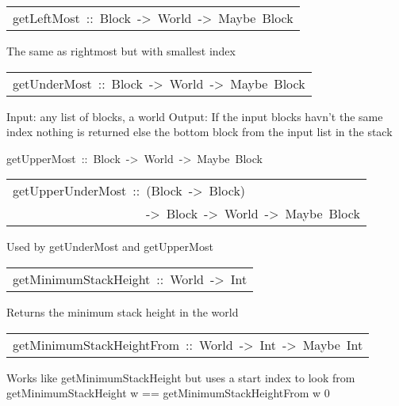 \begin{haddockdesc}
\item[\begin{tabular}{@{}l}
getLeftMost\ ::\ {\char 91}Block{\char 93}\ ->\ World\ ->\ Maybe\ Block
\end{tabular}]\haddockbegindoc
The same as rightmost but with smallest index
\par

\end{haddockdesc}
\begin{haddockdesc}
\item[\begin{tabular}{@{}l}
getUnderMost\ ::\ {\char 91}Block{\char 93}\ ->\ World\ ->\ Maybe\ Block
\end{tabular}]\haddockbegindoc
Input: any list of blocks, a world
  Output: If the input blocks havn't the same index nothing is returned else the bottom block from the 
        input list in the stack  
\par

\end{haddockdesc}
\begin{haddockdesc}
\item[
getUpperMost\ ::\ {\char 91}Block{\char 93}\ ->\ World\ ->\ Maybe\ Block
]
\end{haddockdesc}
\begin{haddockdesc}
\item[\begin{tabular}{@{}l}
getUpperUnderMost\ ::\ ({\char 91}Block{\char 93}\ ->\ Block)\\\ \ \ \ \ \ \ \ \ \ \ \ \ \ \ \ \ \ \ \ \ ->\ {\char 91}Block{\char 93}\ ->\ World\ ->\ Maybe\ Block
\end{tabular}]\haddockbegindoc
Used by getUnderMost and getUpperMost 
\par

\end{haddockdesc}
\begin{haddockdesc}
\item[\begin{tabular}{@{}l}
getMinimumStackHeight\ ::\ World\ ->\ Int
\end{tabular}]\haddockbegindoc
Returns the minimum stack height in the world 
\par

\end{haddockdesc}
\begin{haddockdesc}
\item[\begin{tabular}{@{}l}
getMinimumStackHeightFrom\ ::\ World\ ->\ Int\ ->\ Maybe\ Int
\end{tabular}]\haddockbegindoc
Works like getMinimumStackHeight but uses a start index to look from
  getMinimumStackHeight w == getMinimumStackHeightFrom w 0 
\par

\end{haddockdesc}
